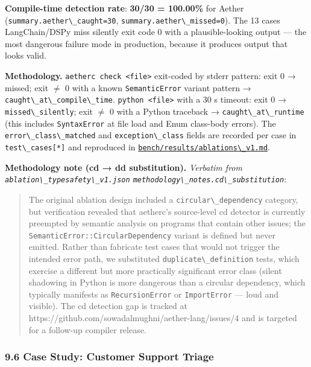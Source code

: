 \documentclass[
]{article}
\newcommand{\passthrough}[1]{#1}
\begin{document}
\textbf{Compile-time detection rate}: \textbf{30/30 = 100.00\%} for
Aether (\passthrough{\lstinline!summary.aether\_caught=30!},
\passthrough{\lstinline!summary.aether\_missed=0!}). The 13 cases
LangChain/DSPy miss silently exit code 0 with a plausible-looking output
--- the most dangerous failure mode in production, because it produces
output that looks valid.

\textbf{Methodology.} \passthrough{\lstinline!aetherc check <file>!}
exit-coded by stderr pattern: exit 0 → missed; exit \(\neq\) 0 with a
known \passthrough{\lstinline!SemanticError!} variant pattern →
\passthrough{\lstinline!caught\_at\_compile\_time!}.
\passthrough{\lstinline!python <file>!} with a 30 s timeout: exit 0 →
\passthrough{\lstinline!missed\_silently!}; exit \(\neq\) 0 with a
Python traceback → \passthrough{\lstinline!caught\_at\_runtime!} (this
includes \passthrough{\lstinline!SyntaxError!} at file load and Enum
class-body errors). The \passthrough{\lstinline!error\_class\_matched!}
and \passthrough{\lstinline!exception\_class!} fields are recorded per
case in \passthrough{\lstinline!test\_cases[*]!} and reproduced in
\href{../bench/results/ablations_v1.md}{\passthrough{\lstinline!bench/results/ablations\_v1.md!}}.

\textbf{Methodology note (cd → dd substitution).} \emph{Verbatim from
\passthrough{\lstinline!ablation\_typesafety\_v1.json!}
\passthrough{\lstinline!methodology\_notes.cd\_substitution!}}:

\begin{quote}
The original ablation design included a
\passthrough{\lstinline!circular\_dependency!} category, but
verification revealed that aetherc's source-level cd detector is
currently preempted by semantic analysis on programs that contain other
issues; the \passthrough{\lstinline!SemanticError::CircularDependency!}
variant is defined but never emitted. Rather than fabricate test cases
that would not trigger the intended error path, we substituted
\passthrough{\lstinline!duplicate\_definition!} tests, which exercise a
different but more practically significant error class (silent shadowing
in Python is more dangerous than a circular dependency, which typically
manifests as \passthrough{\lstinline!RecursionError!} or
\passthrough{\lstinline!ImportError!} --- loud and visible). The cd
detection gap is tracked at
https://github.com/sowadalmughni/aether-lang/issues/4 and is targeted
for a follow-up compiler release.
\end{quote}

\subsubsection{9.6 Case Study: Customer Support
Triage}\label{case-study-customer-support-triage}
\end{document}
